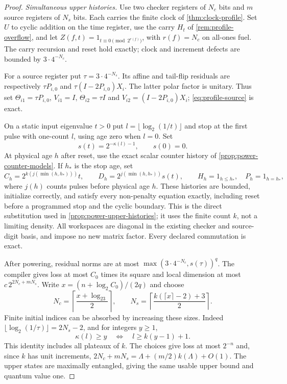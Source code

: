 \begin{proof}
\par\smallskip\noindent\textit{Simultaneous upper histories.}\quad
Use two checker registers of $N_c$ bits and $m$ source registers of $N_s$ bits. Each carries the finite clock of \cref{thm:clock-profile}. Set $U$ to cyclic addition on the time register, use the carry $H_t$ of \cref{rem:profile-overflow}, and let $Z(f,t)=1_{t\equiv0\pmod{2^{r(f)}}}$, with $r(f)=N_c$ on all-ones fuel. The carry recursion and reset hold exactly; clock and increment defects are bounded by $3\cdot4^{-N_c}$.

For a source register put $\tau=3\cdot4^{-N_s}$. Its affine and tail-flip residuals are respectively $\tau P_{i,0}$ and $\tau(I-2P_{i,0})X_i$. The latter polar factor is unitary. Thus set $\Theta_{i1}=\tau P_{i,0}$, $V_{i1}=I$, $\Theta_{i2}=\tau I$ and $V_{i2}=(I-2P_{i,0})X_i$; \eqref{eq:profile-source} is exact.

On a static input eigenvalue $t>0$ put $l=\lfloor\log_2(1/t)\rfloor$ and stop at the first pulse with one-count $l$, using age zero when $l=0$. Set
\begin{equation}\label{eq:profile-penalty}
 s(t)=2^{-\kappa(l)-1},\qquad s(0)=0.
\end{equation}
At physical age $h$ after reset, use the exact scalar counter history of \cref{prop:power-counter-models}. If $h_*$ is the stop age, set
\[
 C_h=2^{k(j(\min(h,h_*)))}t,\qquad
 D_h=2^{j(\min(h,h_*))}s(t),\qquad
 H_h=1_{h\le h_*},\quad P_h=1_{h=h_*},
\]
where $j(h)$ counts pulses before physical age $h$. These histories are bounded, initialize correctly, and satisfy every non-penalty equation exactly, including reset before a programmed stop and the cyclic boundary. This is the direct substitution used in \cref{prop:power-upper-histories}; it uses the finite count $k$, not a limiting density. All workspaces are diagonal in the existing checker and source-digit basis, and impose no new matrix factor. Every declared commutation is exact.

After powering, residual norms are at most $\max(3\cdot4^{-N_c},s(\tau))^q$. The compiler gives loss at most $C_0$ times its square and local dimension at most $c\,2^{2N_c+mN_s}$. Write $x=(n+\log_2C_0)/(2q)$ and choose
\[
 N_c=\left\lceil\frac{x+\log_23}{2}\right\rceil,\qquad
 N_s=\left\lceil\frac{k(\lceil x\rceil-2)+3}{2}\right\rceil.
\]
Finite initial indices can be absorbed by increasing these sizes. Indeed $\lfloor\log_2(1/\tau)\rfloor=2N_s-2$, and for integers $y\ge1$,
\[
 \kappa(l)\ge y\quad\Longleftrightarrow\quad l\ge k(y-1)+1.
\]
This identity includes all plateaux of $k$. The choices give loss at most $2^{-n}$ and, since $k$ has unit increments, $2N_c+mN_s=\Lambda+(m/2)k(\Lambda)+O(1)$. The upper states are maximally entangled, giving the same usable upper bound and quantum value one.


\end{proof}
